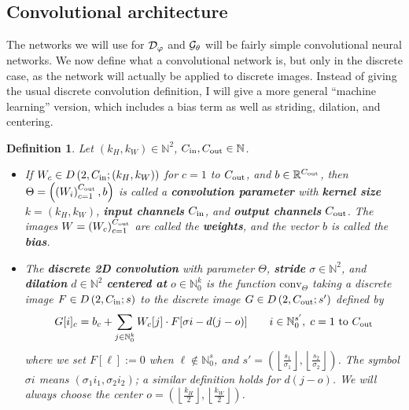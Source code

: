 \documentclass{article}
\newcommand{\R}{\mathbb{R}}
\newcommand{\Natural}{\mathbb{N}}
\newtheorem{defn}{Definition}
\begin{document}
	\subsection{Convolutional architecture}\label{sec:convolutions}
	The networks we will use for \(\mathcal{D}_\varphi\) and \(\mathcal{G}_\theta\) will be fairly simple convolutional neural networks. We now define what a convolutional network is, but only in the discrete case, as the network will actually be applied to discrete images. Instead of giving the usual discrete convolution definition, I will give a more general ``machine learning'' version, which includes a bias term  as well as striding, dilation, and centering.
	
	\newcommand{\inchannels}{{C_{\textnormal{in}}}}
	\newcommand{\outchannels}{{C_{\textnormal{out}}}}
	\newcommand{\conv}{\mathrm{conv}}
	\begin{defn}\label{def:discrete_conv}
		Let \((k_H, k_W) \in \Natural^2\), \(\inchannels, \outchannels \in \Natural\).
		\begin{itemize} 
			\item If \(W_c \in \discim{2}{\inchannels}{(k_H, k_W)}\) for \(c=1\) to \(\outchannels\), and \(b \in \R^\outchannels\), then \(\Theta = \left(\left(W_i\right)_{c=1}^{\outchannels}, b\right)\) is called a \textbf{convolution parameter} with \textbf{kernel size} \(k = (k_H, k_W)\), \textbf{input channels} \(\inchannels\), and \textbf{output channels} \(\outchannels\). The images \(W = \left(W_c\right)_{c=1}^\outchannels\) are called the \textbf{weights}, and the vector \(b\) is called the \textbf{bias}.
			
			\item The \textbf{discrete 2D convolution} with parameter \(\Theta\), \textbf{stride} \(\sigma \in \Natural^2\), and \textbf{dilation} \(d \in \Natural^2\) \textbf{centered at} \(o \in \Natural_0^k\) is the function \(\conv_\Theta\) taking a discrete image \(F \in \discim{2}{\inchannels}{s}\) to the discrete image \(G \in \discim{2}{\outchannels}{s'}\) defined by
			\begin{equation}\label{eq:discrete_conv}
				G[i]_c = b_c + \sum_{j \in \Natural_0^k}W_c[j] \cdot F[\sigma i - d(j - o)] \qquad i \in \Natural_0^{s'},\; c =1 \text{ to } \outchannels
			\end{equation}
			where we set \(F[\ell] := 0\) when \(\ell \notin \Natural_0^s\), and \(s' = \left(\left\lfloor \frac{s_1}{\sigma_1}\right\rfloor, \left\lfloor\frac{s_2}{\sigma_2}\right\rfloor\right)\). The symbol \(\sigma i\) means \((\sigma_1 i_1, \sigma_2 i_2)\); a similar definition holds for \(d(j-o)\). We will always choose the center \(o = \left(\left\lfloor \frac{k_H}{2}\right\rfloor, \left\lfloor\frac{k_W}{2} \right\rfloor\right)\).
		\end{itemize}
	\end{defn}
\end{document}
